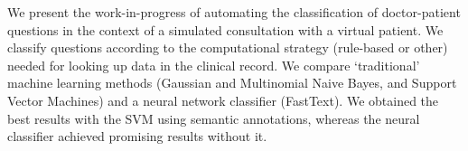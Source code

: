 We present the work-in-progress of automating the classification of doctor-patient questions in the context of a simulated consultation with a virtual patient. We classify questions according to the computational strategy (rule-based or other) needed for looking up data in the clinical record. We compare ‘traditional' machine learning methods (Gaussian and Multinomial Naive Bayes, and Support Vector Machines) and a neural network classifier (FastText). We obtained the best results with the SVM using semantic annotations, whereas the neural classifier achieved promising results without it.
